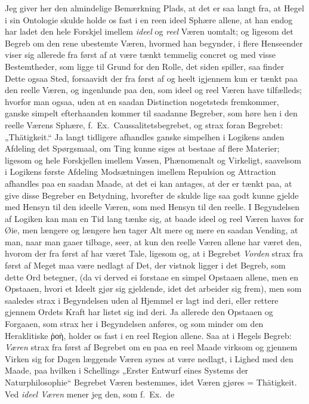 \documentclass[12pt,a4paper]{book}
\newcommand{\apage}[1]{\marginnote{\footnotesize\textit{[#1]}}}
\begin{document}
Jeg giver her den almindelige Bemærkning Plads, at det er saa langt fra, at
Hegel i sin Ontologie skulde holde os fast i en reen ideel Sphære allene,
at han endog har ladet den hele Forskjel imellem \emph{ideel} og \emph{reel} Væren
uomtalt; og ligesom det Begreb om den rene ubestemte Væren, hvormed han
begynder, i flere Henseender viser sig allerede fra først af at være tænkt
temmelig concret og med visse Bestemtheder, som ligge til Grund for den
Rolle, det siden spiller, saa finder Dette ogsaa Sted, forsaavidt der fra
først af og heelt igjennem kun er tænkt paa den reelle Væren, og ingenlunde
paa den, som ideel og reel Væren have tilfælleds; hvorfor man ogsaa, uden
at en saadan Distinction nogetsteds fremkommer, ganske simpelt efterhaanden
kommer til saadanne Begreber, som høre hen i den reelle Værens Sphære,
f.\ Ex.\ Caussalitetsbegrebet, og strax foran Begrebet: „Thätigkeit.“ Ja
langt tidligere afhandles ganske simpelhen i Logikens anden Afdeling det
Spørgsmaal, om Ting kunne siges at bestaae af flere \apage{74} Materier; ligesom og
hele Forskjellen imellem Væsen, Phænomenalt og Virkeligt, saavelsom i
Logikens første Afdeling Modsætningen imellem Repulsion og Attraction
afhandles paa en saadan Maade, at det ei kan antages, at der er tænkt paa,
at give disse Begreber en Betydning, hvorefter de skulde lige saa godt
kunne gjelde med Hensyn til den ideelle Væren, som med Hensyn til den
reelle. I Begyndelsen af Logiken kan man en Tid lang tænke sig, at baade
ideel og reel Væren haves for Øie, men længere og længere hen tager Alt
mere og mere en saadan Vending, at man, naar man gaaer tilbage, seer, at
kun den reelle Væren allene har været den, hvorom der fra først af har
været Tale, ligesom og, at i Begrebet \emph{Vorden} strax fra først af Meget maa
være nedlagt af Det, der vistnok ligger i det Begreb, som dette Ord
betegner, (da vi derved ei forstaae en simpel Opstaaen allene, men en
Opstaaen, hvori et Ideelt gjør sig gjeldende, idet det arbeider sig frem),
men som saaledes strax i Begyndelsen uden al Hjemmel er lagt ind deri,
eller rettere gjennem Ordets Kraft har listet sig ind deri. Ja allerede den
Opstaaen og Forgaaen, som strax her i Begyndelsen anføres, og som minder om
den Heraklitiske ῥοὴ, holder os fast i en reel Region allene. Saa at i
Hegels Begreb: \emph{Væren} strax fra først af Begrebet om en paa en reel Maade
virksom og gjennem Virken sig for Dagen læggende Væren synes at være
nedlagt, i Lighed med den Maade, paa hvilken i Schellings „Erster Entwurf
eines Systems der Naturphilosophie“ Begrebet Væren bestemmes, idet Væren
gjøres = Thätigkeit. Ved \emph{ideel Væren} mener jeg den, som f.\ Ex.\ de
\end{document}

